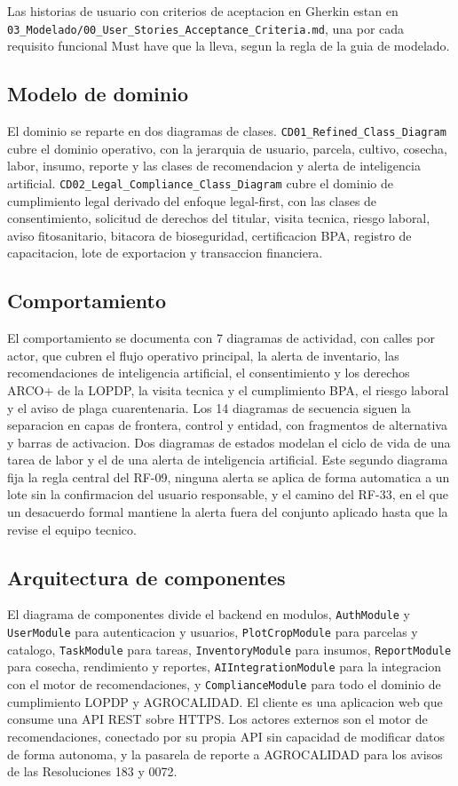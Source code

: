 \documentclass[11pt,a4paper]{article}
\newcommand{\ruta}[1]{\texttt{#1}}
\begin{document}
Las historias de usuario con criterios de aceptacion en Gherkin estan en \ruta{03\_Modelado/00\_User\_Stories\_Acceptance\_Criteria.md}, una por cada requisito funcional Must have que la lleva, segun la regla de la guia de modelado.

\subsection{Modelo de dominio}

El dominio se reparte en dos diagramas de clases. \texttt{CD01\_Refined\_Class\_Diagram} cubre el dominio operativo, con la jerarquia de usuario, parcela, cultivo, cosecha, labor, insumo, reporte y las clases de recomendacion y alerta de inteligencia artificial. \texttt{CD02\_Legal\_Compliance\_Class\_Diagram} cubre el dominio de cumplimiento legal derivado del enfoque legal-first, con las clases de consentimiento, solicitud de derechos del titular, visita tecnica, riesgo laboral, aviso fitosanitario, bitacora de bioseguridad, certificacion BPA, registro de capacitacion, lote de exportacion y transaccion financiera.

\subsection{Comportamiento}

El comportamiento se documenta con 7 diagramas de actividad, con calles por actor, que cubren el flujo operativo principal, la alerta de inventario, las recomendaciones de inteligencia artificial, el consentimiento y los derechos ARCO+ de la LOPDP, la visita tecnica y el cumplimiento BPA, el riesgo laboral y el aviso de plaga cuarentenaria. Los 14 diagramas de secuencia siguen la separacion en capas de frontera, control y entidad, con fragmentos de alternativa y barras de activacion. Dos diagramas de estados modelan el ciclo de vida de una tarea de labor y el de una alerta de inteligencia artificial. Este segundo diagrama fija la regla central del RF-09, ninguna alerta se aplica de forma automatica a un lote sin la confirmacion del usuario responsable, y el camino del RF-33, en el que un desacuerdo formal mantiene la alerta fuera del conjunto aplicado hasta que la revise el equipo tecnico.

\subsection{Arquitectura de componentes}

El diagrama de componentes divide el backend en modulos, \texttt{AuthModule} y \texttt{UserModule} para autenticacion y usuarios, \texttt{PlotCropModule} para parcelas y catalogo, \texttt{TaskModule} para tareas, \texttt{InventoryModule} para insumos, \texttt{ReportModule} para cosecha, rendimiento y reportes, \texttt{AIIntegrationModule} para la integracion con el motor de recomendaciones, y \texttt{ComplianceModule} para todo el dominio de cumplimiento LOPDP y AGROCALIDAD. El cliente es una aplicacion web que consume una API REST sobre HTTPS. Los actores externos son el motor de recomendaciones, conectado por su propia API sin capacidad de modificar datos de forma autonoma, y la pasarela de reporte a AGROCALIDAD para los avisos de las Resoluciones 183 y 0072.
\end{document}
